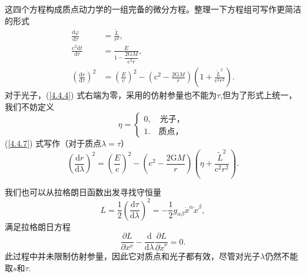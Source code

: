 \documentclass[11pt, a4paper, oneside, onecolumn]{ctexart}
\numberwithin{equation}{subsection}
\begin{document}
\newpage
这四个方程构成质点动力学的一组完备的微分方程。整理一下方程组可写作更简洁的形式
\begin{align}
\frac{\mathrm{d}\varphi}{\mathrm{d}\tau}&=\frac{\widetilde{L}}{r^{2}},\\
\frac{\mathrm{c}^{2}\mathrm{d}t}{\mathrm{d}\tau}&=\frac{E}{1-\dfrac{2\mathrm{G}M}{\mathrm{c}^{2}r}},\\
\left(\frac{\mathrm{d}r}{\mathrm{d}\tau}\right)^{2}&=\left(\frac{E}{\mathrm{c}}\right)^{2}-\left(\mathrm{c}^{2}-\frac{2\mathrm{G}M}{r}\right)\left(1+\frac{\widetilde{L}^{2}}{\mathrm{c}^{2}r^{2}}\right).\label{4.4.7}
\end{align}
对于光子，(\ref{4.4.4}) 式右端为零，采用的仿射参量也不能为$\tau$,但为了形式上统一，我们不妨定义
\begin{equation}
\eta=
\begin{cases}
0,\quad\text{光子，}\\
1.\quad\text{质点，}
\end{cases}
\end{equation}
(\ref{4.4.7}) 式写作（对于质点$\lambda=\tau$）
\begin{equation}
\left(\frac{\mathrm{d}r}{\mathrm{d}\lambda}\right)^{2}=\left(\frac{E}{\mathrm{c}}\right)^{2}-\left(\mathrm{c}^{2}-\frac{2\mathrm{G}M}{r}\right)\left(\eta+\frac{\widetilde{L}^{2}}{\mathrm{c}^{2}r^{2}}\right).
\end{equation}

我们也可以从拉格朗日函数出发寻找守恒量
\begin{equation}
L=\frac12\left(\frac{\mathrm{d}\tau}{\mathrm{d}\lambda}\right)^{2}=-\frac12g_{\alpha\beta}\dot{x}^{\alpha}\dot{x}^{\beta},
\end{equation}
满足拉格朗日方程
\begin{equation}
\frac{\partial{}L}{\partial{}x^{\nu}}-\frac{\mathrm{d}}{\mathrm{d}\lambda}\frac{\partial{}L}{\partial{}\dot{x}^{\nu}}=0.
\end{equation}
此过程中并未限制仿射参量，因此它对质点和光子都有效，尽管对光子$\lambda$仍然不能取$s$和$\tau$.
\end{document}
